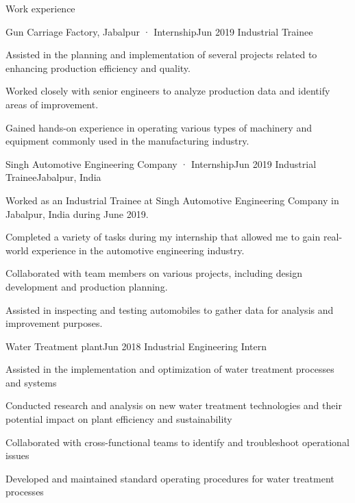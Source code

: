 \documentclass{resume} %
\begin{document}
\begin{rSection}{Work experience}
\begin{rSubsection}{Gun Carriage Factory, Jabalpur · Internship}{Jun 2019 }{Industrial Trainee}{}
                \item Assisted in the planning and implementation of several projects related to enhancing production efficiency and quality.
                \item Worked closely with senior engineers to analyze production data and identify areas of improvement.
                \item Gained hands-on experience in operating various types of machinery and equipment commonly used in the manufacturing industry.
\end{rSubsection}
\begin{rSubsection}{Singh Automotive Engineering Company · Internship}{Jun 2019 }{Industrial Trainee}{Jabalpur, India}
                \item Worked as an Industrial Trainee at Singh Automotive Engineering Company in Jabalpur, India during June 2019.
                \item Completed a variety of tasks during my internship that allowed me to gain real-world experience in the automotive engineering industry.
                \item Collaborated with team members on various projects, including design development and production planning.
                \item Assisted in inspecting and testing automobiles to gather data for analysis and improvement purposes.
\end{rSubsection}
\begin{rSubsection}{Water Treatment plant}{Jun 2018 }{Industrial Engineering Intern}{}
                \item Assisted in the implementation and optimization of water treatment processes and systems
                \item Conducted research and analysis on new water treatment technologies and their potential impact on plant efficiency and sustainability
                \item Collaborated with cross-functional teams to identify and troubleshoot operational issues
                \item Developed and maintained standard operating procedures for water treatment processes
\end{rSubsection}
\end{rSection}
\end{document}
